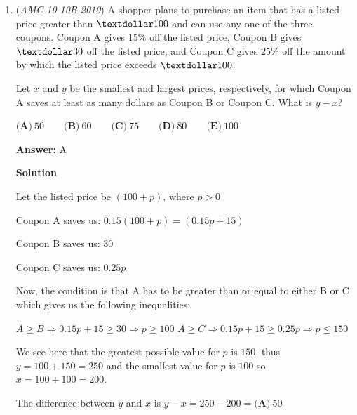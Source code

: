 \begin{enumerate}
\textbf{Solution 2}

Let $x$ be the time she drove in the rain. Thus, the number of minutes she did not drive in the rain is $40-x$ . 

 Since we are calculating the time in minutes, it is best to convert the speeds in minutes. Thus, the speed per minute when it is not raining is $\frac{1}{2}$ miles per minute, and $\frac{1}{3}$ miles per minute when it is raining. Thus, we have the equation, $\frac{1}{2} \cdot (40-x) + \frac{1}{3} \cdot x = 16$ 

 Solving, gives $x$ = $24$ , so the amount of time she drove in the rain is $24$ minutes.

 


	\item (\textit{AMC 10 10B 2010}) A shopper plans to purchase an item that has a listed price greater than $\textdollar 100$ and can use any one of the three coupons. Coupon A gives $15\%$ off the listed price, Coupon B gives $\textdollar 30$ off the listed price, and Coupon C gives $25\%$ off the amount by which the listed price exceeds
$\textdollar 100$. 

Let $x$ and $y$ be the smallest and largest prices, respectively, for which Coupon A saves at least as many dollars as Coupon B or Coupon C. What is $y - x$?


 $\textbf{(A)}\ 50 \qquad \textbf{(B)}\ 60 \qquad \textbf{(C)}\ 75 \qquad \textbf{(D)}\ 80  \qquad \textbf{(E)}\ 100$

 \textbf{Answer: }A



\textbf{Solution}

Let the listed price be $(100 + p)$, where $p > 0$

 Coupon A saves us: $0.15(100+p) = (0.15p + 15)$

 Coupon B saves us: $30$

 Coupon C saves us: $0.25p$

 Now, the condition is that A has to be greater than or equal to either B or C which gives us the following inequalities:

 $A \geq B \Rightarrow 0.15p + 15 \geq 30 \Rightarrow p \geq 100$
$A \geq C \Rightarrow 0.15p + 15 \geq 0.25p \Rightarrow p \leq 150$

 We see here that the greatest possible value for $p$ is $150$, thus $y = 100 + 150 = 250$ and the smallest value for $p$ is $100$ so $x = 100 + 100 = 200$. 

 The difference between $y$ and $x$ is $y - x = 250 - 200 = \boxed{\textbf{(A)}\ 50}$




\end{enumerate}
